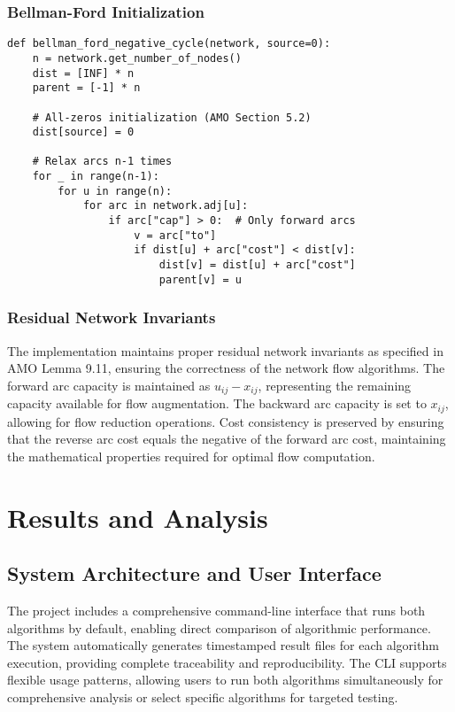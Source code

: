 \documentclass[12pt,a4paper]{article}
\begin{document}
\subsubsection{Bellman-Ford Initialization}
\begin{lstlisting}[caption=Proper Bellman-Ford Implementation]
def bellman_ford_negative_cycle(network, source=0):
    n = network.get_number_of_nodes()
    dist = [INF] * n
    parent = [-1] * n
    
    # All-zeros initialization (AMO Section 5.2)
    dist[source] = 0
    
    # Relax arcs n-1 times
    for _ in range(n-1):
        for u in range(n):
            for arc in network.adj[u]:
                if arc["cap"] > 0:  # Only forward arcs
                    v = arc["to"]
                    if dist[u] + arc["cost"] < dist[v]:
                        dist[v] = dist[u] + arc["cost"]
                        parent[v] = u
\end{lstlisting}

\subsubsection{Residual Network Invariants}

The implementation maintains proper residual network invariants as specified in AMO Lemma 9.11, ensuring the correctness of the network flow algorithms. The forward arc capacity is maintained as $u_{ij} - x_{ij}$, representing the remaining capacity available for flow augmentation. The backward arc capacity is set to $x_{ij}$, allowing for flow reduction operations. Cost consistency is preserved by ensuring that the reverse arc cost equals the negative of the forward arc cost, maintaining the mathematical properties required for optimal flow computation.

\section{Results and Analysis}

\subsection{System Architecture and User Interface}

The project includes a comprehensive command-line interface that runs both algorithms by default, enabling direct comparison of algorithmic performance. The system automatically generates timestamped result files for each algorithm execution, providing complete traceability and reproducibility. The CLI supports flexible usage patterns, allowing users to run both algorithms simultaneously for comprehensive analysis or select specific algorithms for targeted testing.
\end{document}
